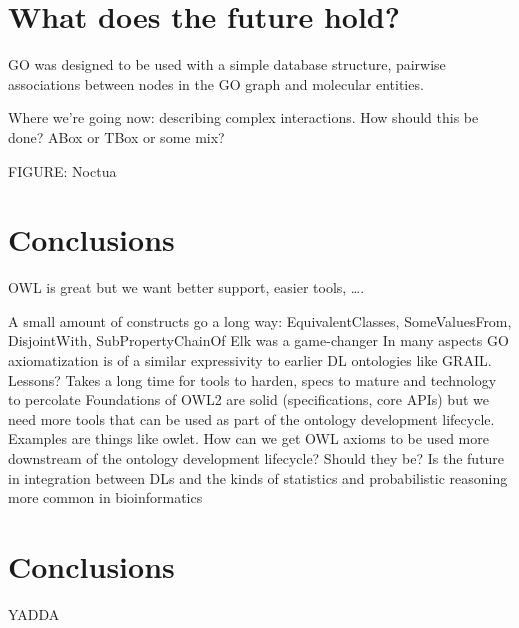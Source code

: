 \documentclass{llncs}
\begin{document}
\section{What does the future hold?}



GO was designed to be used with a simple database structure, pairwise associations between nodes in the GO graph and molecular entities. 

Where we’re going now: describing complex interactions. How should this be done? ABox or TBox or some mix? 

FIGURE: Noctua

\section{Conclusions}


OWL is great but we want better support, easier tools, ….

A small amount of constructs go a long way: EquivalentClasses, SomeValuesFrom, DisjointWith, SubProperty{Chain}Of
Elk was a game-changer
In many aspects GO axiomatization is of a similar expressivity to earlier DL ontologies like GRAIL. Lessons? Takes a long time for tools to harden, specs to mature and technology to percolate
Foundations of OWL2 are solid (specifications, core APIs) but we need more tools that can be used as part of the ontology development lifecycle. Examples are things like owlet.
How can we get OWL axioms to be used more downstream of the ontology development lifecycle? Should they be? Is the future in integration between DLs and the kinds of statistics and probabilistic reasoning more common in bioinformatics























\section{Conclusions}

YADDA



\end{document}
